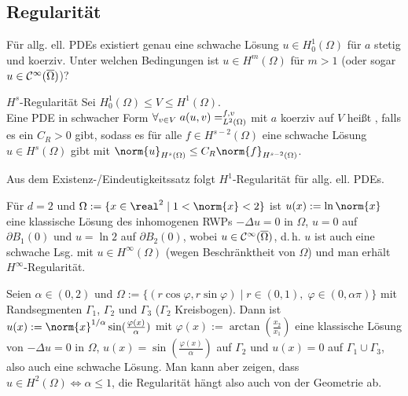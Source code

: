 \subsection{%
    Regularität%
}

\begin{Bem}
    Für allg. ell. PDEs existiert genau eine schwache Lösung $u \in H^1_0(\Omega)$ für
    $a$ stetig und koerziv.
    Unter welchen Bedingungen ist $u \in H^m(\Omega)$ für $m > 1$
    (oder sogar $u \in \mathcal{C}^\infty(\overline{\Omega})$)?
\end{Bem}

\begin{Def}{$H^s$-Regularität}
    Sei $H^1_0(\Omega) \le V \le H^1(\Omega)$.\\
    Eine PDE in schwacher Form $\forall_{v \in V}\; a(u, v) = \sp{f, v}_{L^2(\Omega)}$ mit
    $a$ koerziv auf $V$ heißt , falls es ein $C_R > 0$ gibt, sodass
    es für alle $f \in H^{s-2}(\Omega)$ eine schwache Lösung $u \in H^s(\Omega)$ gibt mit
    $\norm{u}_{H^s(\Omega)} \le C_R \norm{f}_{H^{s-2}(\Omega)}$.
\end{Def}

\begin{Bem}
    Aus dem Existenz-/Eindeutigkeitssatz folgt $H^1$-Regularität für allg. ell. PDEs.
\end{Bem}

\linie

\begin{Bsp}
    Für $d = 2$ und $\Omega := \{x \in \real^2 \;|\; 1 < \norm{x} < 2\}$
    ist $u(x) := \ln \norm{x}$ eine klassische Lösung des inhomogenen RWPs
    $-\Delta u = 0$ in $\Omega$,
    $u = 0$ auf $\partial B_1(0)$ und
    $u = \ln 2$ auf $\partial B_2(0)$, wobei $u \in \mathcal{C}^\infty(\overline{\Omega})$,
    d.\,h. $u$ ist auch eine schwache Lsg. mit $u \in H^\infty(\Omega)$
    (wegen Beschränktheit von $\Omega$)
    und man erhält $H^\infty$-Regularität.
\end{Bsp}

\begin{Bsp}
    Seien $\alpha \in (0, 2)$ und
    $\Omega := \{(r\cos\varphi, r\sin\varphi) \;|\; r \in (0, 1),\; \varphi \in (0, \alpha\pi)\}$
    mit Randsegmenten $\Gamma_1$, $\Gamma_2$ und $\Gamma_3$ ($\Gamma_2$ Kreisbogen).
    Dann ist $u(x) := \norm{x}^{1/\alpha} \sin(\frac{\varphi(x)}{\alpha})$ mit
    $\varphi(x) := \arctan(\frac{x_2}{x_1})$ eine klassische Lösung von
    $-\Delta u = 0$ in $\Omega$,
    $u(x) = \sin(\frac{\varphi(x)}{\alpha})$ auf $\Gamma_2$ und
    $u(x) = 0$ auf $\Gamma_1 \cup \Gamma_3$,
    also auch eine schwache Lösung.
    Man kann aber zeigen, dass $u \in H^2(\Omega) \iff \alpha \le 1$,
    die Regularität hängt also auch von der Geometrie ab.
\end{Bsp}

